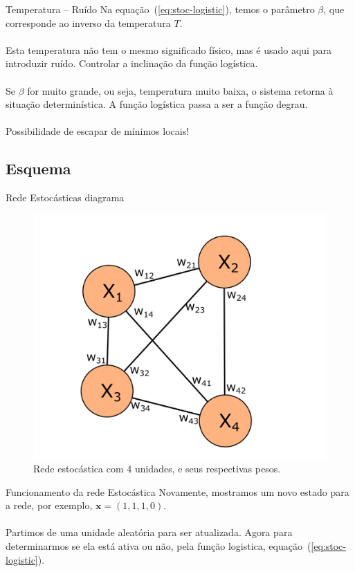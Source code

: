\begin{frame}{Temperatura -- Ruído}%
  \justifying%
  Na equação~(\ref{eq:stoc-logistic}), temos o parâmetro $\beta$, que corresponde ao inverso da temperatura $T$.
  \\~\\
  Esta temperatura não tem o mesmo significado físico, mas é usado aqui para introduzir ruído. Controlar a inclinação da função logística.
  \\~\\
  Se $\beta$ for muito grande, ou seja, temperatura muito baixa, o sistema retorna à situação determinística. A função logística passa a ser a função degrau.
  \\~\\
  Possibilidade de escapar de mínimos locais!
\end{frame}

\subsection{Esquema}
\begin{frame}{Rede Estocásticas diagrama}%
  \begin{figure}%
    \label{fig:stoc-diagram}%
    \includegraphics[scale=0.5]{images/stochastic_full.png}
    \caption{Rede estocástica com 4 unidades, e seus respectivas pesos.}
  \end{figure}
\end{frame}

\begin{frame}{Funcionamento da rede Estocástica}%
  \justifying%
  Novamente, mostramos um novo estado para a rede, por exemplo, $\mathrm{\mathbf{x}} = (1, 1, 1, 0)$.
  \\~\\
  Partimos de uma unidade aleatória para ser atualizada. Agora para determinarmos se ela está ativa ou não, pela função logistica, equação~(\ref{eq:stoc-logistic}).
\end{frame}

